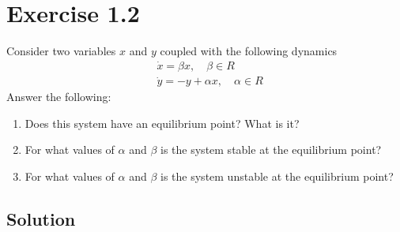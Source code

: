 \section*{Exercise 1.2}

Consider two variables \( x \) and \( y \) coupled with the following dynamics
\begin{align*}
     & \dot{x}=\beta x, \quad \beta \in R      \\
     & \dot{y}=-y+\alpha x, \quad \alpha \in R
\end{align*}
Answer the following:
\begin{enumerate}[noitemsep]
    \item Does this system have an equilibrium point? What is it?
    \item For what values of \( \alpha \) and \( \beta \) is the system stable at the equilibrium point?
    \item For what values of \( \alpha \) and \( \beta \) is the system unstable at the equilibrium point?
\end{enumerate}

\subsection*{Solution}

